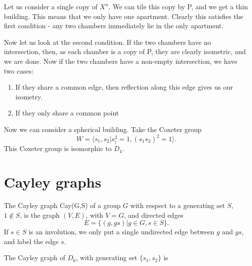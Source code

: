 \documentclass[11pt]{article}
\begin{document}
\begin{example}
    Let us consider a single copy of $X^n$. We can tile this copy by P, and we get a thin building. This means that we only have one apartment. Clearly this satisfies the first condition - any two chambers immediately lie in the only apartment. 

    Now let us look at the second condition. If the two chambers have no intersection, then, as each chamber is a copy of P, they are clearly isometric, and we are done. Now if the two chambers have a non-empty intersection, we have two cases:
    \begin{enumerate}
        \item If they share a common edge, then reflection along this edge gives us our isometry.
        \item If they only share a common point
    \end{enumerate}
\end{example}

\begin{example}
    Now we can consider a spherical building. Take the Coxeter group
    \[W=\langle s_1,s_2 | s_i^2=1, (s_1s_2)^2=1\rangle.
    \]
    This Coxeter group is isomorphic to $D_4$. 
\end{example}

\section{Cayley graphs}
\begin{definition}
    The Cayley graph Cay(G,S) of a group $G$ with respect to a generating set $S$, $1\notin S$, is the graph $(V,E)$, with $V=G$, and directed edges
    \[E=\{(g,gs)|g\in G, s\in S\}.\]
    If $s\in S$ is an involution, we only put a single undirected edge between $g$ and $gs$, and label the edge $s$. 
\end{definition}

\begin{example}
    The Cayley graph of $D_6$, with generating set $\{s_1,s_2\}$ is 


\end{example}
\end{document}
